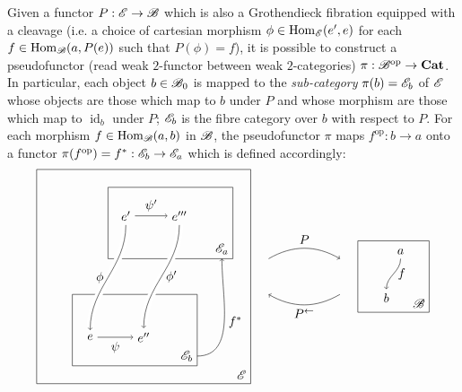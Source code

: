 \documentclass[12pt]{article}
\theoremstyle{definition}
\theoremstyle{remark}
\DeclareMathOperator{\id}{id}
\newcommand{\opcat}{\mathrm{op}}
\DeclareMathOperator{\Hom}{Hom}
\begin{document}
Given a functor $P : \mathscr{E} \to \mathscr{B}$ which is also a Grothendieck fibration equipped with a cleavage (i.e. a choice of cartesian morphism $\phi \in \Hom_{\catE}(e', e)$ for each $f \in \Hom_{\catB}(a,P(e))$ such that $P(\phi) = f$), it is possible to construct a pseudofunctor (read weak $2$-functor between weak $2$-categories) $\pi : \catB^{\opcat} \to \mathbf{Cat}$. In particular, each object $b \in \mathscr{B}_0$ is mapped to the \textit{sub-category} $\pi(b) = \mathscr{E}_b$ of $\mathscr{E}$ whose objects are those which map to $b$ under $P$ and whose morphism are those which map to $\id_{b}$ under $P$; $\mathscr{E}_b$ is the fibre category over $b$ with respect to $P$. For each morphism $f \in \Hom_{\catB}(a,b)$ in $\mathscr{B}$, the pseudofunctor $\pi$ maps $f^{\opcat} : b \to a$ onto a functor $\pi(f^{\opcat}) = f^{\ast} : \catE_{b} \to \catE_{a}$ which is defined accordingly:
\[
    \begin{tikzpicture}
        \begin{scope}[shift={(-4.5,0)}]
            \draw (-3,+3) rectangle (+3,-3) node[above left]{$\catE$};
            \begin{scope}[shift={(-1,+2.5)}]
                \draw (0,0) rectangle (+3.5,-2) node[above left](catEa){$\catE_a$};
                \draw (+0.5, -0.8) node(e2){$e'$};
                \draw (+2, -0.8) node(e4){$e'''$};
                \draw[->] (e2) to node[above]{$\psi'$} (e4);
            \end{scope}
            \begin{scope}[shift={(-2,-0.5)}]
                \draw (0,0) rectangle (+3.5,-2) node[above left](catEb){$\catE_b$};
                \draw (+0.5, -1.2) node(e1){$e$};
                \draw (+2, -1.2) node(e3){$e''$};
                \draw[->] (e1) to node[below]{$\psi$} (e3);
            \end{scope}
            \draw[white, line width=2mm] (e2) to[out=-90,in=+90] (e1);
            \draw[white, line width=2mm] (e4) to[out=-90,in=+90] (e3);
            \draw[->] (e2) to[out=-90,in=+90] node[left ]{$\phi$} (e1);
            \draw[->] (e4) to[out=-90,in=+90] node[right]{$\phi'$} (e3);
            \draw[->] (catEb) to[out=0,in=-90] node[right]{$f^{\ast}$} (catEa);
        \end{scope}
        \begin{scope}[shift={(+1.5,+1)}]
            \draw (0,0) rectangle (+2,-2) node[above left]{$\catB$};
            \draw (+1.2, -0.3) node(a){$a$};
            \draw (+0.8,-1.6) node(b){$b$};
            \draw[->] (a) to[out=-90,in=+90] node[right]{$f$} (b);
        \end{scope}
        \draw[->] (-1,+0.5) to[bend left ] node[above]{$P$} (+1, 0.5);
        \draw[<-] (-1,-0.5) to[bend right] node[below]{$P^{\leftarrow}$} (+1, -0.5);
    \end{tikzpicture}
\]
\end{document}
